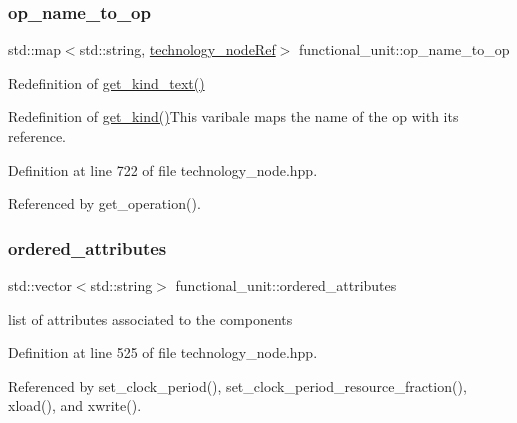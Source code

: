 \subsubsection{\texorpdfstring{op\+\_\+name\+\_\+to\+\_\+op}{op\_name\_to\_op}}
{\footnotesize\ttfamily std\+::map$<$std\+::string, \hyperlink{technology__node_8hpp_a33dd193b7bd6b987bf0d8a770a819fa7}{technology\+\_\+node\+Ref}$>$ functional\+\_\+unit\+::op\+\_\+name\+\_\+to\+\_\+op\hspace{0.3cm}{\ttfamily [private]}}



Redefinition of \hyperlink{structtechnology__node_a4b8785a8d6c2db19e1bec0d3eef5c8f2}{get\+\_\+kind\+\_\+text()} 

Redefinition of \hyperlink{structtechnology__node_addc44daafd369586b8cee878d4df5e12}{get\+\_\+kind()}This varibale maps the name of the op with its reference. 

Definition at line 722 of file technology\+\_\+node.\+hpp.



Referenced by get\+\_\+operation().

\mbox{\label{structfunctional__unit_aabf1baef8b91d54997fab1d56cb3d829}} 
\subsubsection{\texorpdfstring{ordered\+\_\+attributes}{ordered\_attributes}}
{\footnotesize\ttfamily std\+::vector$<$std\+::string$>$ functional\+\_\+unit\+::ordered\+\_\+attributes}



list of attributes associated to the components 



Definition at line 525 of file technology\+\_\+node.\+hpp.



Referenced by set\+\_\+clock\+\_\+period(), set\+\_\+clock\+\_\+period\+\_\+resource\+\_\+fraction(), xload(), and xwrite().

\mbox{\label{structfunctional__unit_a5b8bbf88b9922ed54eeb7782c283b498}} 
